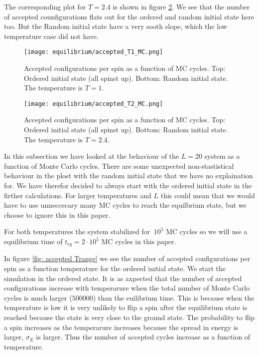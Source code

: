 \documentclass[11pt,a4wide]{article}
\begin{document}
The corresponding plot for $T=2.4$ is shown in figure \ref{fig:  accepted T2}. We see that the number of accepted counfigurations flats out for the ordered and random initial state here too. But the Random initial state have a very sooth slope, which the low temperature case did not have. 


\begin{figure}[htp]
\texttt{[image: equilibrium/accepted\_T1\_MC.png]}
\caption{Accepted configurations per spin as a function of MC cycles. Top: Ordered initial state (all spinst up). Bottom: Random initial state. The temperature is $T=1$.}
\centering
\label{fig: accepted T1}
\end{figure}

\begin{figure}[htp]
\texttt{[image: equilibrium/accepted\_T2\_MC.png]}
\caption{Accepted configurations per spin as a function of MC cycles. Top: Ordered initial state (all spinst up). Bottom: Random initial state. The temperature is $T=2.4$.}
\centering
\label{fig:  accepted T2}
\end{figure}



In this subsection we have looked at the behaviour of the $L=20$ system as a function of Monte Carlo cycles. There are some unexpected non-stastistical behaviour in the plost with the random initial state that we have no explaination for. We have therefor decided to always start with the ordered initial state in the firther calculations. For larger temperatures and $L$ this could mean that we would have to use unneccecary many MC cycles to reach the equilbrium state, but we choose to ignore this in this paper. 

For both temperatures the system stabilized for $~10^5$ MC cycles so we will use a equilibrium time of $t_{eq} = 2\cdot10^5$ MC cycles in this paper. 

In figure \ref{fig:  accepted Trange} we see the number of accepted configurations per spin as a function temperature for the ordered initial state. We start the simulation in the ordered state. It is as axpected that the number of accepted configurations increase with temperarure when the total number of Monte Carlo cycles is much larger ($500000$) than the euilibrium time. This is because when the temperature is low it is very unlikely to flip a spin after the equilibrium state is reached because the state is very close to the ground state. The probability to flip a spin increases as the temperarure increases because the spread in energy is larger, $\sigma_E$ is larger. Thus the number of accepted cycles increase as a function of temperature.
\end{document}
